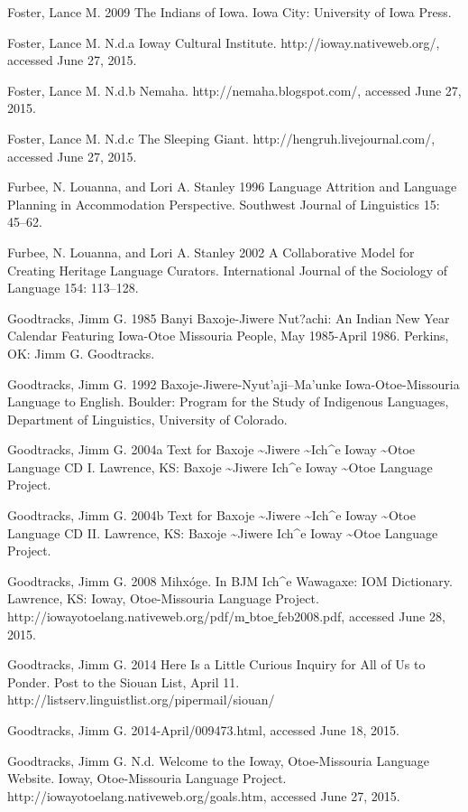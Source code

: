 \documentclass[output=paper]{LSP/langsci}
\begin{document}
\begin{reflist}
Foster, Lance M. 2009 The Indians of Iowa. Iowa City: University of Iowa Press.

Foster, Lance M. N.d.a Ioway Cultural Institute. http://ioway.nativeweb.org/, accessed June 27, 2015.

Foster, Lance M. N.d.b Nemaha. http://nemaha.blogspot.com/, accessed June 27, 2015.

Foster, Lance M. N.d.c The Sleeping Giant. http://hengruh.livejournal.com/, accessed June 27, 2015.

Furbee, N. Louanna, and Lori A. Stanley 1996 Language Attrition and Language Planning in Accommodation Perspective. Southwest Journal of Linguistics 15: 45--62.

Furbee, N. Louanna, and Lori A. Stanley 2002 A Collaborative Model for Creating Heritage Language Curators. International Journal of the Sociology of Language 154: 113--128.

Goodtracks, Jimm G. 1985 Banyi Baxoje-Jiwere Nut?achi: An Indian New Year Calendar Featuring Iowa-Otoe Missouria People, May 1985-April 1986. Perkins, OK: Jimm G. Goodtracks.

Goodtracks, Jimm G. 1992 Baxoje-Jiwere-Nyut'aji--Ma'unke Iowa-Otoe-Missouria Language to English. Boulder: Program for the Study of Indigenous Languages, Department of Linguistics, University of Colorado.

Goodtracks, Jimm G. 2004a Text for Baxoje \textasciitilde Jiwere \textasciitilde Ich\^{ }e Ioway \textasciitilde Otoe Language CD I. Lawrence, KS: Baxoje \textasciitilde Jiwere Ich\^{ }e Ioway \textasciitilde Otoe Language Project.

Goodtracks, Jimm G. 2004b Text for Baxoje \textasciitilde Jiwere \textasciitilde Ich\^{ }e Ioway \textasciitilde Otoe Language CD II. Lawrence, KS: Baxoje \textasciitilde Jiwere Ich\^{ }e Ioway \textasciitilde Otoe Language Project.

Goodtracks, Jimm G. 2008 Mihx\'oge. In BJM Ich\^{ }e Wawagaxe: IOM Dictionary. Lawrence, KS: Ioway, Otoe-Missouria Language Project. http://iowayotoelang.nativeweb.org/pdf/m\underline{ }btoe\underline{ }feb2008.pdf, accessed June 28, 2015.

Goodtracks, Jimm G. 2014 Here Is a Little Curious Inquiry for All of Us to Ponder. Post to the Siouan List, April 11. http://listserv.linguistlist.org/pipermail/siouan/

Goodtracks, Jimm G. 2014-April/009473.html, accessed June 18, 2015.

Goodtracks, Jimm G. N.d. Welcome to the Ioway, Otoe-Missouria Language Website. Ioway, Otoe-Missouria Language Project. http://iowayotoelang.nativeweb.org/goals.htm, accessed June 27, 2015.


\end{reflist}
\end{document}
